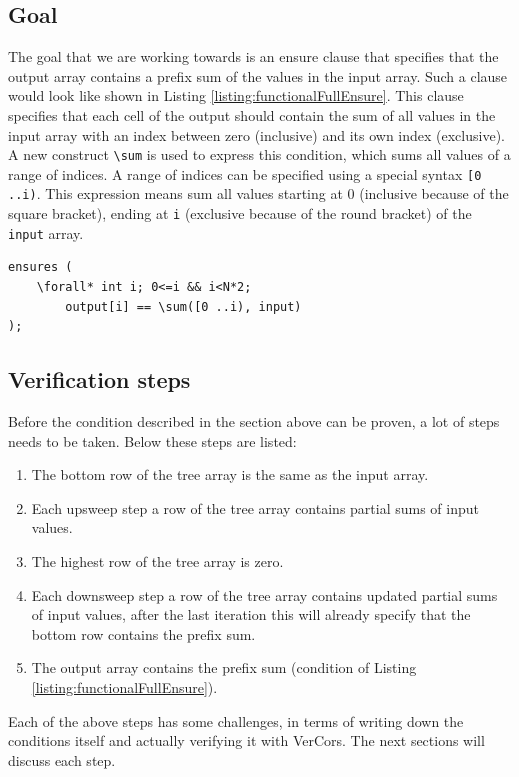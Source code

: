 \documentclass[a4paper]{article}
\newcommand{\code}[1]{\texttt{\small \color{inline}#1}} %
\begin{document}
\subsection{Goal}
The goal that we are working towards is an ensure clause that specifies that the output array contains a prefix sum of the values in the input array. Such a clause would look like shown in Listing \ref{listing:functionalFullEnsure}. This clause specifies that each cell of the output should contain the sum of all values in the input array with an index between zero (inclusive) and its own index (exclusive). A new construct \code{\textbackslash sum} is used to express this condition, which sums all values of a range of indices. A range of indices can be specified using a special syntax \code{[0 ..i)}. This expression means sum all values starting at 0 (inclusive because of the square bracket), ending at \code{i} (exclusive because of the round bracket) of the \code{input} array.

\begin{lstlisting}[caption=Ensure clause of the program that should be proven eventually, label=listing:functionalFullEnsure, float=htpb]
ensures (
	\forall* int i; 0<=i && i<N*2; 
		output[i] == \sum([0 ..i), input)
);
\end{lstlisting}

\subsection{Verification steps}
Before the condition described in the section above can be proven, a lot of steps needs to be taken. Below these steps are listed:
\begin{enumerate}
	\item The bottom row of the tree array is the same as the input array.
	\item Each upsweep step a row of the tree array contains partial sums of input values.
	\item The highest row of the tree array is zero.
	\item Each downsweep step a row of the tree array contains updated partial sums of input values, after the last iteration this will already specify that the bottom row contains the prefix sum.
	\item The output array contains the prefix sum (condition of Listing \ref{listing:functionalFullEnsure}).
\end{enumerate}

Each of the above steps has some challenges, in terms of writing down the conditions itself and actually verifying it with VerCors. The next sections will discuss each step.
\end{document}
